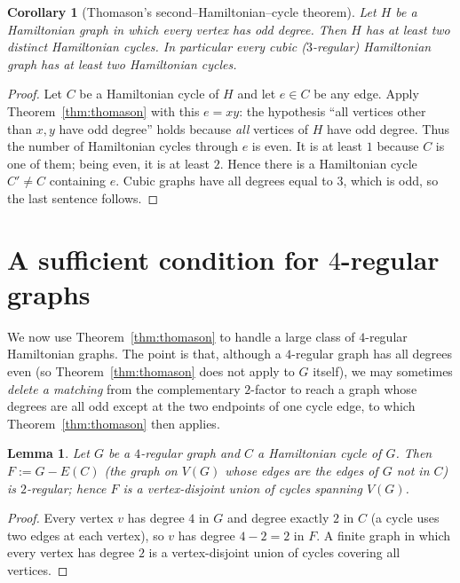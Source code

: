 \documentclass{amsart}
\theoremstyle{plain}
\newtheorem{lemma}{Lemma}
\newtheorem{corollary}{Corollary}
\theoremstyle{definition}
\begin{document}
\begin{corollary}[Thomason's second–Hamiltonian–cycle theorem]\label{cor:odd}
Let $H$ be a Hamiltonian graph in which every vertex has odd degree.  Then $H$
has at least two distinct Hamiltonian cycles.  In particular every cubic
($3$-regular) Hamiltonian graph has at least two Hamiltonian cycles.
\end{corollary}

\begin{proof}
Let $C$ be a Hamiltonian cycle of $H$ and let $e\in C$ be any edge.  Apply
Theorem~\ref{thm:thomason} with this $e=xy$: the hypothesis ``all vertices other
than $x,y$ have odd degree'' holds because \emph{all} vertices of $H$ have odd
degree.  Thus the number of Hamiltonian cycles through $e$ is even.  It is at
least $1$ because $C$ is one of them; being even, it is at least $2$.  Hence
there is a Hamiltonian cycle $C'\neq C$ containing $e$.  Cubic graphs have all
degrees equal to $3$, which is odd, so the last sentence follows.
\end{proof}

\section{A sufficient condition for $4$-regular graphs}

We now use Theorem~\ref{thm:thomason} to handle a large class of $4$-regular
Hamiltonian graphs.  The point is that, although a $4$-regular graph has all
degrees even (so Theorem~\ref{thm:thomason} does not apply to $G$ itself), we may
sometimes \emph{delete a matching} from the complementary $2$-factor to reach a
graph whose degrees are all odd except at the two endpoints of one cycle edge,
to which Theorem~\ref{thm:thomason} then applies.

\begin{lemma}\label{lem:2factor}
Let $G$ be a $4$-regular graph and $C$ a Hamiltonian cycle of $G$.  Then
$F:=G-E(C)$ (the graph on $V(G)$ whose edges are the edges of $G$ not in $C$) is
$2$-regular; hence $F$ is a vertex-disjoint union of cycles spanning $V(G)$.
\end{lemma}

\begin{proof}
Every vertex $v$ has degree $4$ in $G$ and degree exactly $2$ in $C$ (a cycle
uses two edges at each vertex), so $v$ has degree $4-2=2$ in $F$.  A finite graph
in which every vertex has degree $2$ is a vertex-disjoint union of cycles
covering all vertices.
\end{proof}
\end{document}
